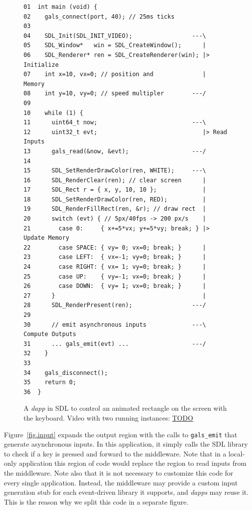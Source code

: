 \documentclass[sigplan,screen]{acmart}
\newcommand{\dapp}{\emph{dapp}\xspace}
\newcommand{\dapps}{\emph{dapps}\xspace}
\begin{document}
\begin{figure}[t]
{\scriptsize
\begin{verbatim}
01  int main (void) {
02    gals_connect(port, 40); // 25ms ticks
03
04    SDL_Init(SDL_INIT_VIDEO);                 ---\
05    SDL_Window*   win = SDL_CreateWindow();      |
06    SDL_Renderer* ren = SDL_CreateRenderer(win); |> Initialize
07    int x=10, vx=0; // position and              |    Memory
08    int y=10, vy=0; // speed multipler        ---/
09
10    while (1) {
11      uint64_t now;                           ---\
12      uint32_t evt;                              |> Read Inputs
13      gals_read(&now, &evt);                  ---/
14
15      SDL_SetRenderDrawColor(ren, WHITE);     ---\
16      SDL_RenderClear(ren); // clear screen      |
17      SDL_Rect r = { x, y, 10, 10 };             |
18      SDL_SetRenderDrawColor(ren, RED);          |
19      SDL_RenderFillRect(ren, &r); // draw rect  |
20      switch (evt) { // 5px/40fps -> 200 px/s    |
21        case 0:     { x+=5*vx; y+=5*vy; break; } |> Update Memory
22        case SPACE: { vy= 0; vx=0; break; }      |
23        case LEFT:  { vx=-1; vy=0; break; }      |
24        case RIGHT: { vx= 1; vy=0; break; }      |
25        case UP:    { vy=-1; vx=0; break; }      |
26        case DOWN:  { vy= 1; vx=0; break; }      |
27      }                                          |
28      SDL_RenderPresent(ren);                 ---/
29
30      // emit asynchronous inputs             ---\  Compute Outputs
31      ... gals_emit(evt) ...                  ---/
32    }
33
34    gals_disconnect();
35    return 0;
36  }
\end{verbatim}
}
  \caption{
    \label{fig.sdl}
    A \dapp in SDL to control an animated rectangle on the screen with the keyboard.
    Video with two running instances: \url{TODO}
  }
\end{figure}

Figure~\ref{fig.input} expands the output region with the calls to
\texttt{gals\_emit} that generate asynchronous inputs.
In this application, it simply calls the SDL library to check if a key is
pressed and forward to the middleware.
Note that in a local-only application this region of code would replace the
region to read inputs from the middleware.
Note also that it is not necessary to customize this code for every single
application.
Instead, the middleware may provide a custom input generation stub for each
event-driven library it supports, and \dapps may reuse it.
This is the reason why we split this code in a separate figure.
\end{document}
